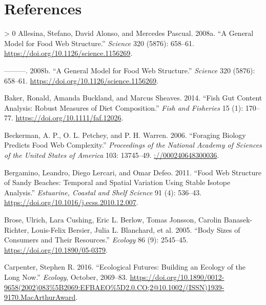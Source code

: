 \documentclass{article}
\newlength{\cslhangindent}
\newenvironment{CSLReferences}[3] %
 {%
  \setlength{\parindent}{0pt}
  \ifodd #1 \everypar{\setlength{\hangindent}{\cslhangindent}}\ignorespaces\fi
  \ifnum #2 > 0
  \setlength{\parskip}{#2\baselineskip}
  \fi
 }%
 {}
\begin{document}
\hypertarget{references}{%
\section*{References}\label{references}}

\hypertarget{refs}{}
\begin{CSLReferences}{1}{0}
\leavevmode\hypertarget{ref-allesinaGeneralModelFood2008}{}%
Allesina, Stefano, David Alonso, and Mercedes Pascual. 2008a. {``A
{General Model} for {Food Web Structure}.''} \emph{Science} 320 (5876):
658--61. \url{https://doi.org/10.1126/science.1156269}.

\leavevmode\hypertarget{ref-allesina2008}{}%
---------. 2008b. {``A General Model for Food Web Structure.''}
\emph{Science} 320 (5876): 658--61.
\url{https://doi.org/10.1126/science.1156269}.

\leavevmode\hypertarget{ref-bakerFishGutContent2014}{}%
Baker, Ronald, Amanda Buckland, and Marcus Sheaves. 2014. {``Fish Gut
Content Analysis: Robust Measures of Diet Composition.''} \emph{Fish and
Fisheries} 15 (1): 170--77. \url{https://doi.org/10.1111/faf.12026}.

\leavevmode\hypertarget{ref-beckermanForagingBiologyPredicts2006}{}%
Beckerman, A. P., O. L. Petchey, and P. H. Warren. 2006. {``Foraging
Biology Predicts Food Web Complexity.''} \emph{Proceedings of the
National Academy of Sciences of the United States of America} 103:
13745--49. \url{://000240648300036}.

\leavevmode\hypertarget{ref-bergaminoFoodWebStructure2011}{}%
Bergamino, Leandro, Diego Lercari, and Omar Defeo. 2011. {``Food Web
Structure of Sandy Beaches: {Temporal} and Spatial Variation Using
Stable Isotope Analysis.''} \emph{Estuarine, Coastal and Shelf Science}
91 (4): 536--43. \url{https://doi.org/10.1016/j.ecss.2010.12.007}.

\leavevmode\hypertarget{ref-broseBodySizesConsumers2005}{}%
Brose, Ulrich, Lara Cushing, Eric L. Berlow, Tomas Jonsson, Carolin
Banasek-Richter, Louis-Felix Bersier, Julia L. Blanchard, et al. 2005.
{``Body {Sizes} of {Consumers} and {Their Resources}.''} \emph{Ecology}
86 (9): 2545--45. \url{https://doi.org/10.1890/05-0379}.

\leavevmode\hypertarget{ref-carpenterEcologicalFuturesBuilding2016}{}%
Carpenter, Stephen R. 2016. {``Ecological Futures: Building an Ecology
of the Long Now.''} \emph{Ecology}, October, 2069--83.
\url{https://doi.org/10.1890/0012-9658(2002)083\%5B2069:EFBAEO\%5D2.0.CO;2@10.1002/(ISSN)1939-9170.MacArthurAward}.


\end{CSLReferences}
\end{document}
